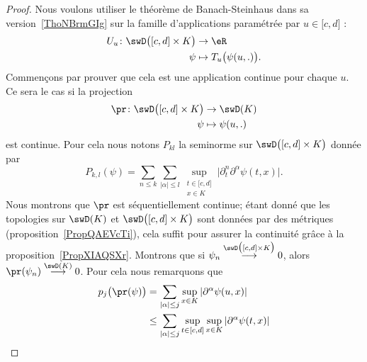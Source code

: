 \begin{proof}
	Nous voulons utiliser le théorème de Banach-Steinhaus dans sa version~\ref{ThoNBrmGIg} sur la famille d'applications paramétrée par \( u\in\mathopen[ c , d \mathclose]\) :
	\begin{equation}        \label{EqBEKoqMb}
		\begin{aligned}
			U_u\colon \swD\big( \mathopen[ c , d \mathclose]\times K \big) & \to \eR                           \\
			\psi                                                           & \mapsto T_u\big( \psi(u,.) \big).
		\end{aligned}
	\end{equation}
	Commençons par prouver que cela est une application continue pour chaque \( u\). Ce sera le cas si la projection
	\begin{equation}
		\begin{aligned}
			\pr\colon \swD\big( \mathopen[ c , d \mathclose]\times K \big) & \to \swD(K)       \\
			\psi                                                           & \mapsto \psi(u,.)
		\end{aligned}
	\end{equation}
	est continue. Pour cela nous notons \( P_{kl}\) la seminorme sur \( \swD\big( \mathopen[ c , d \mathclose]\times K \big)\) donnée par
	\begin{equation}
		P_{k,l}(\psi)=\sum_{n\leq k}\sum_{| \alpha |\leq l}\sup_{\substack{t\in\mathopen[ c , d \mathclose]\\x\in K}}\big| \partial_t^n\partial^{\alpha}\psi(t,x) \big|.
	\end{equation}
	Nous montrons que \( \pr\) est séquentiellement continue; étant donné que les topologies sur \( \swD(K)\) et \( \swD\big( \mathopen[ c , d \mathclose]\times K \big)\) sont données par des métriques (proposition~\ref{PropQAEVcTi}), cela suffit pour assurer la continuité grâce à la proposition~\ref{PropXIAQSXr}. Montrons que si \( \psi_n\stackrel{\swD\big( \mathopen[ c , d \mathclose]\times K \big)}{\longrightarrow}0\), alors \( \pr(\psi_n)\stackrel{\swD(K)}{\longrightarrow}0\). Pour cela nous remarquons que
	\begin{subequations}
		\begin{align}
			p_j\big( \pr(\psi) \big) & =\sum_{| \alpha |\leq j}\sup_{x\in K}| \partial^{\alpha}\psi(u,x) |                                            \\
			                         & \leq \sum_{| \alpha |\leq j}\sup_{t\in\mathopen[ c , d \mathclose]}\sup_{x\in K}| \partial^{\alpha}\psi(t,x) | \\

\end{align}
\end{subequations}
\end{proof}
